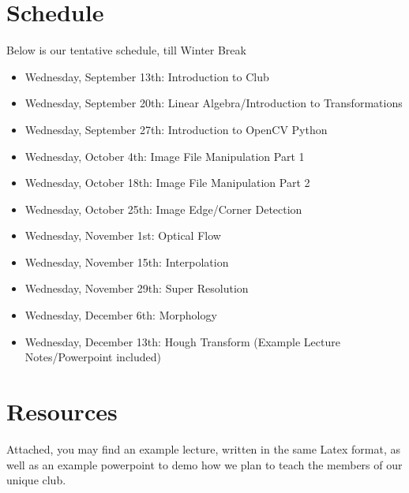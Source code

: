 \documentclass{article}
\begin{document}
\section{Schedule}
Below is our tentative schedule, till Winter Break
\begin{itemize}
  \item Wednesday, September 13th: Introduction to Club
  \item Wednesday, September 20th: Linear Algebra/Introduction to Transformations
  \item Wednesday, September 27th: Introduction to OpenCV Python
  \item Wednesday, October 4th: Image File Manipulation Part 1
  \item Wednesday, October 18th: Image File Manipulation Part 2

  \item Wednesday, October 25th: Image Edge/Corner Detection
  \item Wednesday, November 1st: Optical Flow
 
  \item Wednesday, November 15th: Interpolation

  \item Wednesday, November 29th: Super Resolution

 \item Wednesday, December 6th: Morphology

\item Wednesday, December 13th: Hough Transform (Example Lecture Notes/Powerpoint included)

\end{itemize}


\section{Resources}
Attached, you may find an example lecture, written in the same Latex format, as well as an example powerpoint to demo how we plan to teach the members of our unique club.
\end{document}
